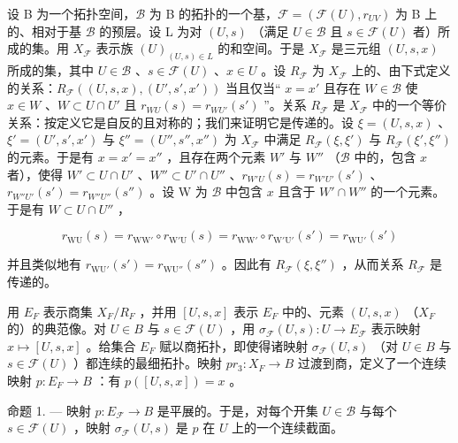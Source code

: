 设 B 为一个拓扑空间，\(\mathcal{B}\) 为 B 的拓扑的一个基，\(\mathcal{F} = (\mathcal{F}(U), r_{UV})\) 为 B 上的、相对于基 \(\mathcal{B}\) 的预层。设 L 为对 \((U, s)\) （满足 \(U \in \mathcal{B}\) 且 \(s \in \mathcal{F}(U)\) 者）所成的集。用 \(X_{\mathcal{F}}\) 表示族 \((U)_{(U,s) \in L}\) 的和空间。于是 \(X_{\mathcal{F}}\) 是三元组 \((U, s, x)\) 所成的集，其中 \(U \in \mathcal{B}\) 、\(s \in \mathcal{F}(U)\) 、\(x \in U\) 。设 \(R_{\mathcal{F}}\) 为 \(X_{\mathcal{F}}\) 上的、由下式定义的关系：\(R_{\mathcal{F}}((U,s,x),(U',s',x'))\) 当且仅当“ \(x = x'\) 且存在 \(W \in \mathcal{B}\) 使 \(x \in W\) 、\(W \subset U \cap U'\) 且 \(r_{WU}(s) = r_{WU'}(s')\) ”。关系 \(R_{\mathcal{F}}\) 是 \(X_{\mathcal{F}}\) 中的一个等价关系：按定义它是自反的且对称的；我们来证明它是传递的。设 \(\xi = (U, s, x)\) 、\(\xi' = (U', s', x')\) 与 \(\xi'' = (U'', s'', x'')\) 为 \(X_{\mathcal{F}}\) 中满足 \(R_{\mathcal{F}}(\xi,\xi')\) 与 \(R_{\mathcal{F}}(\xi',\xi'')\) 的元素。于是有 \(x = x' = x''\) ，且存在两个元素 \(W'\) 与 \(W''\) （\(\mathcal{B}\) 中的，包含 \(x\) 者），使得 \(W' \subset U \cap U'\) 、\(W'' \subset U' \cap U''\) 、\(r_{W'U}(s) = r_{W'U'}(s')\) 、\(r_{W''U'}(s') = r_{W''U''}(s'')\) 。设 W 为 \(\mathcal{B}\) 中包含 \(x\) 且含于 \(W' \cap W''\) 的一个元素。于是有 \(W \subset U \cap U''\) ，

\[
r_{\mathrm{WU}}(s) = r_{\mathrm{WW'}} \circ r_{\mathrm{W'U}}(s) = r_{\mathrm{WW'}} \circ r_{\mathrm{W'U'}}(s') = r_{\mathrm{WU'}}(s')
\]

并且类似地有 \(r_{\mathrm{WU}'}(s') = r_{\mathrm{WU}''}(s'')\) 。因此有 \(R_{\mathcal{F}}(\xi,\xi'')\) ，从而关系 \(R_{\mathcal{F}}\) 是传递的。

用 \(E_{F}\) 表示商集 \(X_{F}/R_{F}\) ，并用 \([U,s,x]\) 表示 \(E_{F}\) 中的、元素 \((U,s,x)\) （\(X_{F}\) 的）的典范像。对 \(U \in B\) 与 \(s \in \mathcal{F}(U)\) ，用 \(\sigma_{\mathcal{F}}(U,s)\colon U \to E_{\mathcal{F}}\) 表示映射 \(x \mapsto [U,s,x]\) 。给集合 \(E_{F}\) 赋以商拓扑，即使得诸映射 \(\sigma_{\mathcal{F}}(U,s)\) （对 \(U \in B\) 与 \(s \in \mathcal{F}(U)\) ）都连续的最细拓扑。映射 \(pr_{3}\colon X_{F} \to B\) 过渡到商，定义了一个连续映射 \(p\colon E_{F} \to B\) ：有 \(p([U,s,x]) = x\) 。

命题 1. --- 映射 \(p\colon E_{\mathcal{F}} \to B\) 是平展的。于是，对每个开集 \(U \in \mathcal{B}\) 与每个 \(s \in \mathcal{F}(U)\) ，映射 \(\sigma_{\mathcal{F}}(U, s)\) 是 \(p\) 在 \(U\) 上的一个连续截面。

